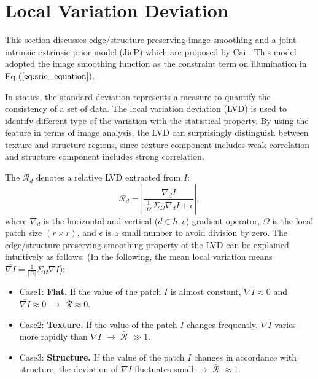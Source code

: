 \section{Local Variation Deviation} \label{sec:lvd}
This section discusses edge/structure preserving image smoothing and a joint intrinsic-extrinsic prior model (JieP) which are proposed by Cai \cite{jiep}. This model adopted the image smoothing function as the constraint term on illumination in Eq.$(\ref{eq:srie_equation})$. 
\par
In statics, the standard deviation represents a measure to quantify the consistency of a set of data. The local variation deviation (LVD) is used to identify different type of the variation with the statistical property. By using the feature in terms of image analysis, the LVD can surprisingly distinguish between texture and structure regions, since texture component includes weak correlation and structure component includes strong correlation. \par
The $\mathcal{R}_{d}$ denotes a relative LVD extracted from $I$:
\begin{equation}
\mathcal{R}_{d} = \left |\frac{\nabla_{d}{I}}{\frac{1}{|\Omega|}\Sigma_{\Omega}\nabla_{d}{I}+\epsilon} \right| ,
\label{eq:lvd}
\end{equation} 
where $\nabla_{d}$ is the horizontal and vertical ($d \in {h, v}$) gradient operator, $\Omega$ is the local patch size $(r \times r)$, and $\epsilon$ is a small number to avoid division by zero. 
The edge/structure preserving smoothing property of the LVD can be explained intuitively as follows:
(In the following, the mean local variation means $\bar{\nabla{I}}= \frac{1}{|\Omega|} \Sigma_{\Omega}\nabla{I}$):
\begin{itemize}
\item Case1: \textbf{Flat.} If the value of the patch $I$ is almost constant, $\nabla{I} \approx 0$ and $\bar{\nabla{I}} \approx 0$ $\rightarrow$ $\bar{\mathcal{R}} \approx 0$. 
\item Case2: \textbf{Texture.} If the value of the patch $I$ changes frequently, $\nabla{I} $ varies more rapidly than $\bar{\nabla{I}}$ $\rightarrow$ $\bar{\mathcal{R}}$ $\gg 1$.
\item Case3: \textbf{Structure.} If the value of the patch $I$ changes in accordance with structure, the deviation of $\nabla{I}$ fluctuates small $\rightarrow$ $\bar{\mathcal{R}}$ $\approx 1$.
\end{itemize}
